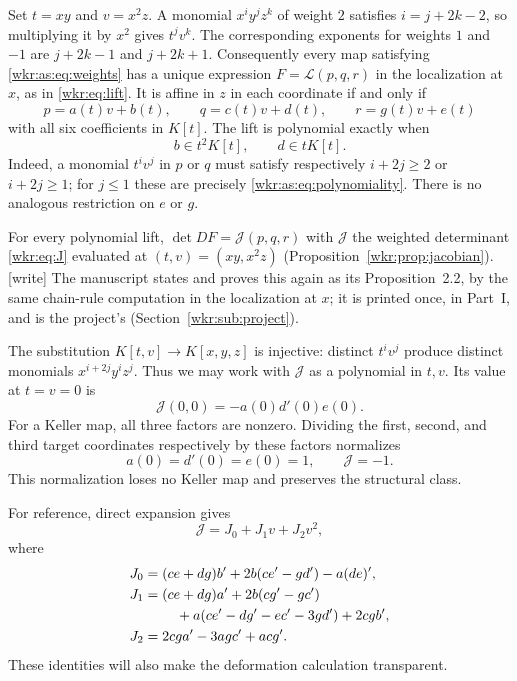 \documentclass[11pt,a4paper]{article}
\numberwithin{equation}{section}
\theoremstyle{definition}
\theoremstyle{remark}
\newcommand{\J}{\mathcal{J}}
\begin{document}
Set $t=xy$ and $v=x^2z$. A monomial $x^iy^jz^k$ of weight $2$ satisfies
$i=j+2k-2$, so multiplying it by $x^2$ gives $t^jv^k$. The corresponding
exponents for weights $1$ and $-1$ are $j+2k-1$ and $j+2k+1$.
Consequently every map satisfying \eqref{wkr:as:eq:weights} has a unique
expression $F=\mathcal L(p,q,r)$ in the localization at $x$, as in
\eqref{wkr:eq:lift}. It is affine in $z$ in each coordinate if and only if
\begin{equation}\label{wkr:as:eq:abcdef}
p=a(t)v+b(t),\qquad q=c(t)v+d(t),\qquad r=g(t)v+e(t)
\end{equation}
with all six coefficients in $K[t]$. The lift is polynomial exactly when
\begin{equation}\label{wkr:as:eq:polynomiality}
b\in t^2K[t],\qquad d\in tK[t].
\end{equation}
Indeed, a monomial $t^iv^j$ in $p$ or $q$ must satisfy respectively
$i+2j\ge2$ or $i+2j\ge1$; for $j\le1$ these are precisely
\eqref{wkr:as:eq:polynomiality}. There is no analogous restriction on $e$
or $g$.

For every polynomial lift, $\det DF=\J(p,q,r)$ with $\J$ the weighted
determinant \eqref{wkr:eq:J} evaluated at $(t,v)=(xy,x^2z)$
(Proposition~\ref{wkr:prop:jacobian}).
\textup{[write]} The manuscript states and proves this again as its
Proposition~2.2, by the same chain-rule computation in the localization
at $x$; it is printed once, in Part~I, and is the project's
(Section~\ref{wkr:sub:project}).

The substitution $K[t,v]\to K[x,y,z]$ is injective: distinct $t^iv^j$
produce distinct monomials $x^{i+2j}y^iz^j$. Thus we may work with $\J$
as a polynomial in $t,v$. Its value at $t=v=0$ is
\begin{equation}\label{wkr:as:eq:normalization}
\J(0,0)=-a(0)d'(0)e(0).
\end{equation}
For a Keller map, all three factors are nonzero. Dividing the first,
second, and third target coordinates respectively by these factors
normalizes
\begin{equation}\label{wkr:as:eq:normalized}
a(0)=d'(0)=e(0)=1,\qquad \J=-1.
\end{equation}
This normalization loses no Keller map and preserves the structural class.

For reference, direct expansion gives
\begin{equation}\label{wkr:as:eq:Jcoeff}
\J=J_0+J_1v+J_2v^2,
\end{equation}
where
\begin{align}
J_0={}&(ce+dg)b'+2b(ce'-gd')-a(de)',\label{wkr:as:eq:J0}\\
J_1={}&(ce+dg)a'+2b(cg'-gc')\notag\\
 &\quad+a(ce'-dg'-ec'-3gd')+2cgb',\label{wkr:as:eq:J1}\\
J_2={}&2cga'-3agc'+acg'.\label{wkr:as:eq:J2}
\end{align}
These identities will also make the deformation calculation transparent.
\end{document}
